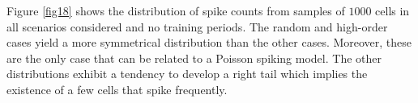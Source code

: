 \documentclass[11pt,letterpaper]{article}
\begin{document}
            Figure \ref{fig18} shows the distribution of spike counts from samples of $1000$ cells
            in all scenarios considered and no training periods.
            The random and high-order cases yield a more symmetrical distribution than the other cases. 
            Moreover, these are the only case that can be related to a Poisson spiking model.
            The other distributions exhibit a tendency to develop a right tail which implies the existence
            of a few cells that spike frequently.
            
		    \begin{figure}[t]
			    \centering
\end{figure}
\end{document}
